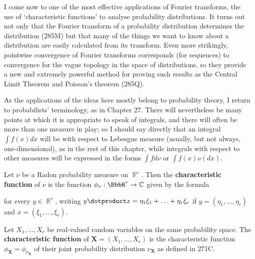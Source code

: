 
\def\chaptername{Fourier analysis}
\def\sectionname{Characteristic functions}


I come now to one of the most effective applications of Fourier
transforms, the use of `characteristic functions' to analyse
probability distributions.   It turns out not only that the Fourier
transform of a probability distribution determines the distribution
(285M) but that many of the things we want to know about a
distribution are easily calculated from its
transform.    Even more strikingly, pointwise
convergence of
Fourier transforms corresponds (for sequences) to convergence for the
vague topology in
the space of distributions, so they provide a new and extremely powerful
method for proving such results as the Central Limit Theorem and
Poisson's theorem (285Q).

As the applications of the ideas here mostly belong to probability
theory, I return to probabilists' terminology, as in Chapter 27.
There will nevertheless be many points at which it is appropriate to
speak of integrals, and there will often be more than one measure in play;
so I should say directly that an integral $\int f(x)dx$ will be with
respect to Lebesgue measure (usually, but not always, one-dimensional),
as in the rest of this chapter,
while integrals with respect to other measures will be expressed
in the forms $\int fd\nu$ or $\int f(x)\nu(dx)$.

 Let $\nu$ be a Radon probability measure
on $\BbbR^r$.   Then the {\bf characteristic function}
of $\nu$ is the function $\phi_{\nu}:\BbbR^r\to\Bbb C$ given by the
formula


\noindent for every $y\in\BbbR^r$, writing
$y\dotproduct x=\eta_1\xi_1+\ldots+\eta_r\xi_r$ if
$y=(\eta_1,\ldots,\eta_r)$ and $x=(\xi_1,\ldots,\xi_r)$.

 Let $X_1,\ldots,X_r$ be real-valued random
variables on the same probability space.   The {\bf characteristic
function} of $\pmb{X}=(X_1,\ldots,X_r)$ is the characteristic function
$\phi_{\pmb{X}}=\phi_{\nu_{\pmb{X}}}$ of their joint probability
distribution $\nu_{\pmb{X}}$ as defined in 271C.

